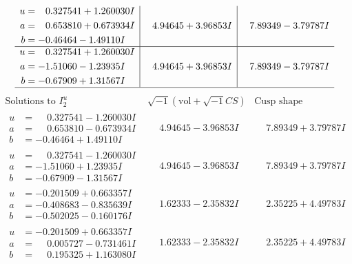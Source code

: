 \documentclass[1p]{elsarticle_modified}
\theoremstyle{definition}
\newcommand{\I}{\sqrt{-1}}
\begin{document}
$$\begin{array}{c|c|c}
\begin{aligned}
u &= \phantom{-}0.327541 + 1.260030 I \\
a &= \phantom{-}0.653810 + 0.673934 I \\
b &= -0.46464 - 1.49110 I\end{aligned}
 & \phantom{-}4.94645 + 3.96853 I & \phantom{-}7.89349 - 3.79787 I \\ \hline\begin{aligned}
u &= \phantom{-}0.327541 + 1.260030 I \\
a &= -1.51060 - 1.23935 I \\
b &= -0.67909 + 1.31567 I\end{aligned}
 & \phantom{-}4.94645 + 3.96853 I & \phantom{-}7.89349 - 3.79787 I\\
 \hline 
 \end{array}$$\newpage$$\begin{array}{c|c|c}  
\text{Solutions to }I^u_{2}& \I (\text{vol} + \sqrt{-1}CS) & \text{Cusp shape}\\
 \hline 
\begin{aligned}
u &= \phantom{-}0.327541 - 1.260030 I \\
a &= \phantom{-}0.653810 - 0.673934 I \\
b &= -0.46464 + 1.49110 I\end{aligned}
 & \phantom{-}4.94645 - 3.96853 I & \phantom{-}7.89349 + 3.79787 I \\ \hline\begin{aligned}
u &= \phantom{-}0.327541 - 1.260030 I \\
a &= -1.51060 + 1.23935 I \\
b &= -0.67909 - 1.31567 I\end{aligned}
 & \phantom{-}4.94645 - 3.96853 I & \phantom{-}7.89349 + 3.79787 I \\ \hline\begin{aligned}
u &= -0.201509 + 0.663357 I \\
a &= -0.408683 - 0.835639 I \\
b &= -0.502025 - 0.160176 I\end{aligned}
 & \phantom{-}1.62333 - 2.35832 I & \phantom{-}2.35225 + 4.49783 I \\ \hline\begin{aligned}
u &= -0.201509 + 0.663357 I \\
a &= \phantom{-}0.005727 - 0.731461 I \\
b &= \phantom{-}0.195325 + 1.163080 I\end{aligned}
 & \phantom{-}1.62333 - 2.35832 I & \phantom{-}2.35225 + 4.49783 I \\ \hline\begin{aligned}

\end{aligned}
\end{array}$$
\end{document}
